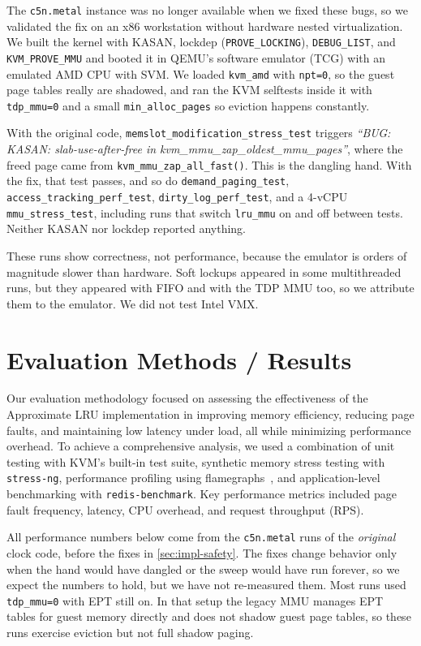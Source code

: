 \documentclass[letterpaper,twocolumn,10pt]{article}
\begin{document}
The \texttt{c5n.metal} instance was no longer available when we fixed these bugs,
so we validated the fix on an x86 workstation without hardware nested
virtualization. We built the kernel with KASAN, lockdep
(\texttt{PROVE\_LOCKING}), \texttt{DEBUG\_LIST}, and \texttt{KVM\_PROVE\_MMU}
and booted it in QEMU's software emulator (TCG) with an emulated AMD CPU with
SVM. We loaded \texttt{kvm\_amd} with \texttt{npt=0}, so the guest page tables
really are shadowed, and ran the KVM selftests inside it with
\texttt{tdp\_mmu=0} and a small \texttt{min\_alloc\_pages} so eviction happens
constantly.

With the original code, \texttt{memslot\_modification\_stress\_test} triggers
\emph{``BUG: KASAN: slab-use-after-free in kvm\_mmu\_zap\_oldest\_mmu\_pages''},
where the freed page came from \texttt{kvm\_mmu\_zap\_all\_fast()}. This is the
dangling hand. With the fix, that test passes, and so do
\texttt{demand\_paging\_test}, \texttt{access\_tracking\_perf\_test},
\texttt{dirty\_log\_perf\_test}, and a 4-vCPU \texttt{mmu\_stress\_test},
including runs that switch \texttt{lru\_mmu} on and off between tests. Neither
KASAN nor lockdep reported anything.

These runs show correctness, not performance, because the emulator is orders of
magnitude slower than hardware. Soft lockups appeared in some multithreaded runs,
but they appeared with FIFO and with the TDP MMU too, so we attribute them to the
emulator. We did not test Intel VMX.

\section{Evaluation Methods / Results}

Our evaluation methodology focused on assessing the effectiveness of the
Approximate LRU implementation in improving memory efficiency, reducing page
faults, and maintaining low latency under load, all while minimizing performance
overhead. To achieve a comprehensive analysis, we used a combination of unit
testing with KVM's built-in test suite, synthetic memory stress testing with
\texttt{stress-ng}, performance profiling using flamegraphs~\cite{gregg2016}, and
application-level benchmarking with \texttt{redis-benchmark}. Key performance metrics included page
fault frequency, latency, CPU overhead, and request throughput (RPS).

All performance numbers below come from the \texttt{c5n.metal} runs of the
\emph{original} clock code, before the fixes in \cref{sec:impl-safety}. The fixes
change behavior only when the hand would have dangled or the sweep would have
run forever, so we expect the numbers to hold, but we have not re-measured them.
Most runs used \texttt{tdp\_mmu=0} with EPT still on. In that setup the legacy MMU
manages EPT tables for guest memory directly and does not shadow guest page
tables, so these runs exercise eviction but not full shadow paging.
\end{document}
